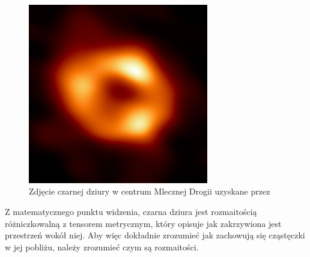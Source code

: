 \renewcommand{\figurename}{Zdjęcie}
\begin{figure}[h]
  \centering
  \includegraphics[width=0.7\textwidth]{ilustracje/zakazany_donut.jpg}
  \caption{Zdjęcie czarnej dziury w centrum Mlecznej Drogii uzyskane przez \cite{mleczna_droga}}\label{zakazany donut}
\end{figure}

Z matematycznego punktu widzenia, czarna dziura jest rozmaitością różniczkowalną z tensorem metrycznym, który opisuje jak zakrzywiona jest przestrzeń wokół niej. Aby więc dokładnie zrozumieć jak zachowują się cząstęczki w jej pobliżu, należy zrozumieć czym są rozmaitości.%
